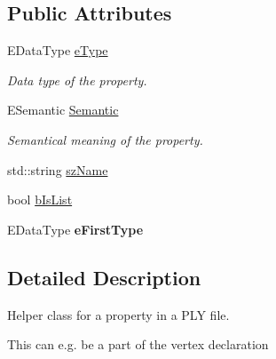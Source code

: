 \subsection*{Public Attributes}
\begin{DoxyCompactItemize}
\item 
\hypertarget{class_assimp_1_1_p_l_y_1_1_property_a6155ee8ad7db472258f99317f261fa9e}{E\+Data\+Type \hyperlink{class_assimp_1_1_p_l_y_1_1_property_a6155ee8ad7db472258f99317f261fa9e}{e\+Type}}\label{class_assimp_1_1_p_l_y_1_1_property_a6155ee8ad7db472258f99317f261fa9e}

\begin{DoxyCompactList}\small\item\em Data type of the property. \end{DoxyCompactList}\item 
\hypertarget{class_assimp_1_1_p_l_y_1_1_property_aa4bef747eb8eaa52008ded265cb94c40}{E\+Semantic \hyperlink{class_assimp_1_1_p_l_y_1_1_property_aa4bef747eb8eaa52008ded265cb94c40}{Semantic}}\label{class_assimp_1_1_p_l_y_1_1_property_aa4bef747eb8eaa52008ded265cb94c40}

\begin{DoxyCompactList}\small\item\em Semantical meaning of the property. \end{DoxyCompactList}\item 
std\+::string \hyperlink{class_assimp_1_1_p_l_y_1_1_property_a4c10eda3b3b890e0fdb5035a0a40a714}{sz\+Name}
\item 
bool \hyperlink{class_assimp_1_1_p_l_y_1_1_property_aa732dc64999ba71453d792e1de0dfd44}{b\+Is\+List}
\item 
\hypertarget{class_assimp_1_1_p_l_y_1_1_property_ac3b0c859eecf98994ec941f17d393e51}{E\+Data\+Type {\bfseries e\+First\+Type}}\label{class_assimp_1_1_p_l_y_1_1_property_ac3b0c859eecf98994ec941f17d393e51}

\end{DoxyCompactItemize}


\subsection{Detailed Description}
Helper class for a property in a P\+L\+Y file. 

This can e.\+g. be a part of the vertex declaration 

